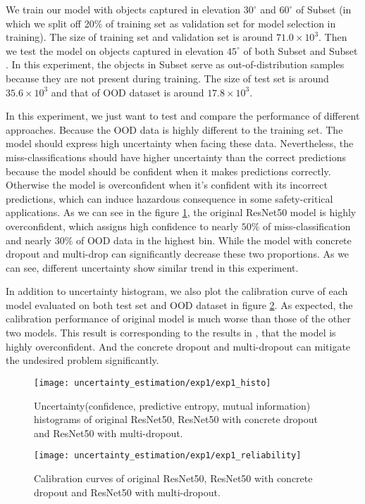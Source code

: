We train our model with objects captured in elevation $30^\circ$ and $60^\circ$ of Subset  (in which we split off 20\% of training set as validation set for model selection in training). The size of training set and validation set is around $71.0\times10^3$. Then we test the model on objects captured in elevation $45^\circ$ of both Subset  and Subset . In this experiment, the objects in Subset  serve as out-of-distribution samples because they are not present during training. The size of test set is around $35.6\times10^3$ and that of OOD dataset is around $17.8\times10^3$. 

In this experiment, we just want to test and compare the performance of different approaches. Because the OOD data is highly different to the training set. The model should express high uncertainty when facing these data. Nevertheless, the miss-classifications should have higher uncertainty than the correct predictions because the model should be confident when it makes predictions correctly. Otherwise the model is overconfident when it's confident with its incorrect predictions, which can induce hazardous consequence in some safety-critical applications. As we can see in the figure \ref{exp1_histo}, the original ResNet50 model is highly overconfident, which assigns high confidence to nearly $50\%$ of miss-classification and nearly $30\%$ of OOD data in the highest bin. While the model with concrete dropout and multi-drop can significantly decrease these two proportions. As we can see, different uncertainty show similar trend in this experiment.

In addition to uncertainty histogram, we also plot the calibration curve of each model evaluated on both test set and OOD dataset in figure \ref{exp1_reliability}. As expected, the calibration performance of original model is much worse than those of the other two models. This result is corresponding to the results in \cite{guo2017calibration}, that the model is highly overconfident. And the concrete dropout and multi-dropout can mitigate the undesired problem significantly.

\begin{figure}[H]
	\begin{center}
		\texttt{[image: uncertainty\_estimation/exp1/exp1\_histo]}
		\caption{Uncertainty(confidence, predictive entropy, mutual information) histograms of original ResNet50, ResNet50 with concrete dropout and ResNet50 with multi-dropout.}		
		\label{exp1_histo}
	\end{center}
\end{figure}
\begin{figure}[H]
	\begin{center}
		\texttt{[image: uncertainty\_estimation/exp1/exp1\_reliability]}
		\caption{Calibration curves of original ResNet50, ResNet50 with concrete dropout and ResNet50 with multi-dropout.}		
		\label{exp1_reliability}
	\end{center}
\end{figure}

